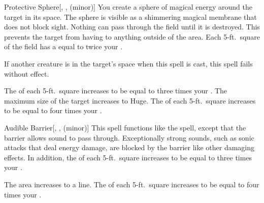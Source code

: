 \lowercase{\hypertarget{spell:Protective Sphere}{}}\label{spell:Protective Sphere}
\begin{freeability}[Rank 1]{\hypertarget{spell:Protective Sphere}{Protective Sphere}}[, ,  (minor)]
You create a sphere of magical energy around the target in its space.
The sphere is visible as a shimmering magical membrane that does not block sight.
Nothing can pass through the field until it is destroyed.
This prevents the target from having  to anything outside of the area.
Each 5-ft.\ square of the field has a  equal to twice your .

If another creature is in the target's space when this spell is cast, this spell fails without effect.

\rankline
{} The  of each 5-ft.\ square increases to be equal to three times your .
 The maximum size of the target increases to Huge.
 The  of each 5-ft.\ square increases to be equal to four times your .
\end{freeability}
\vspace{0.25em}



\lowercase{\hypertarget{spell:Audible Barrier}{}}\label{spell:Audible Barrier}
\begin{freeability}[Rank 3]{\hypertarget{spell:Audible Barrier}{Audible Barrier}}[, ,  (minor)]
\targetrule
This spell functions like the  spell, except that the barrier allows sound to pass through.
Exceptionally strong sounds, such as sonic attacks that deal energy damage, are blocked by the barrier like other damaging effects.
In addition, the  of each 5-ft.\ square increases to be equal to three times your .

 The area increases to a \arealarge line.
 The  of each 5-ft.\ square increases to be equal to four times your .
\end{freeability}
\vspace{0.25em}



